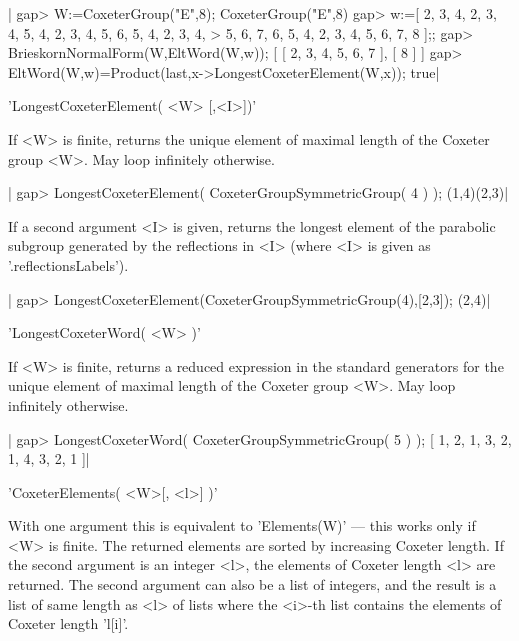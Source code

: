|    gap> W:=CoxeterGroup("E",8);
    CoxeterGroup("E",8)
    gap> w:=[ 2, 3, 4, 2, 3, 4, 5, 4, 2, 3, 4, 5, 6, 5, 4, 2, 3, 4,
    >   5, 6, 7, 6, 5, 4, 2, 3, 4, 5, 6, 7, 8 ];;
    gap> BrieskornNormalForm(W,EltWord(W,w));
    [ [ 2, 3, 4, 5, 6, 7 ], [ 8 ] ]
    gap> EltWord(W,w)=Product(last,x->LongestCoxeterElement(W,x));
    true|



'LongestCoxeterElement( <W> [,<I>])'

If <W>  is finite, returns the  unique element of maximal  length of the
Coxeter group <W>. May loop infinitely otherwise.

|    gap> LongestCoxeterElement( CoxeterGroupSymmetricGroup( 4 ) );
    (1,4)(2,3)|

If  a second  argument <I>  is given,  returns the  longest element  of the
parabolic  subgroup generated by the reflections in <I> (where <I> is given
as '.reflectionsLabels').

|    gap> LongestCoxeterElement(CoxeterGroupSymmetricGroup(4),[2,3]);
    (2,4)|


'LongestCoxeterWord( <W> )'

If  <W>  is  finite,  returns  a  reduced  expression  in  the  standard
generators for the unique element of maximal length of the Coxeter group
<W>. May loop infinitely otherwise.

|    gap> LongestCoxeterWord( CoxeterGroupSymmetricGroup( 5 ) );
    [ 1, 2, 1, 3, 2, 1, 4, 3, 2, 1 ]|


'CoxeterElements( <W>[, <l>] )'

With  one argument this is equivalent  to 'Elements(W)' --- this works only
if  <W> is finite.  The returned elements  are sorted by increasing Coxeter
length.  If the second argument is an  integer <l>, the elements of Coxeter
length  <l>  are  returned.  The  second  argument  can  also  be a list of
integers, and the result is a list of same length as <l> of lists where the
<i>-th list contains the elements of Coxeter length 'l[i]'.

